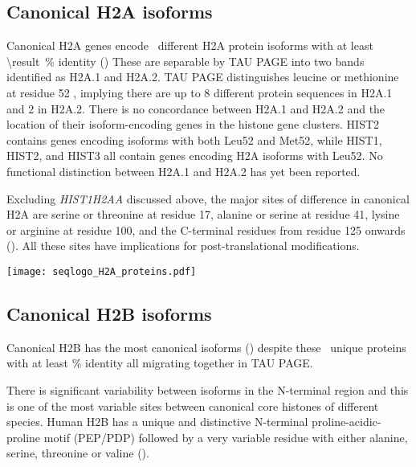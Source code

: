   \subsection{Canonical H2A isoforms}
    Canonical H2A genes encode \HTwoAUniqueProteins{}~different H2A
    protein isoforms with at least
     \SI{\result}{\percent} identity ()
    These are separable by TAU PAGE into two bands identified as H2A.1 and H2A.2.
    TAU PAGE distinguishes leucine or methionine at
    residue 52 \citep{FranklinZweidler1977,Zweidler1977},
    implying there are up to 8 different protein sequences in H2A.1 and 2 in H2A.2.
    There is no concordance between H2A.1 and H2A.2
    and the location of their isoform-encoding genes in the histone gene clusters.
    HIST2 contains genes encoding isoforms with both Leu52 and Met52,
    while HIST1, HIST2, and HIST3 all contain genes encoding H2A isoforms with Leu52.
    No functional distinction between H2A.1 and H2A.2 has yet been reported.

    Excluding \textit{HIST1H2AA} discussed above,
    the major sites of difference in canonical H2A are
    serine or threonine at residue 17,
    alanine or serine at residue 41,
    lysine or arginine at residue 100,
    and the C-terminal residues from residue 125 onwards ().
    All these sites have implications for post-translational modifications.

    \begin{table}
      \caption{%
        Canonical H2A protein isoforms.  Upper panel shows isoforms
        relative to the most common protein sequence.  Lower panel
        shows sequence logo of all isoforms aligned with invariant
        residues in grey.
      }
      \label{tab:H2A-consensus}
      
      \texttt{[image: seqlogo\_H2A\_proteins.pdf]}
    \end{table}

  \subsection{Canonical H2B isoforms}
    Canonical H2B has the most canonical isoforms ()
    despite these \HTwoBUniqueProteins{}~unique proteins
    with at least \result\% identity
    all migrating together in TAU PAGE.

    There is significant variability between isoforms in the N-terminal region
    and this is one of the most variable sites between canonical
    core histones of different species.
    Human H2B has a unique and distinctive N-terminal proline-acidic-proline motif (PEP/PDP)
    followed by a very variable residue with either alanine, serine,
    threonine or valine ().

